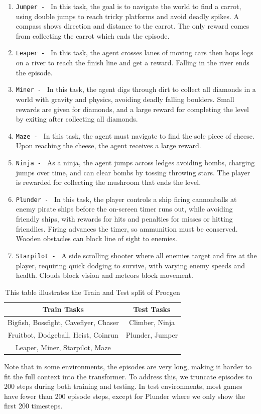 \documentclass[]{fairmeta}
\begin{document}
\begin{enumerate}
    \item \texttt{Jumper - } In this task, the goal is to navigate the world to find a carrot, using double jumps to reach tricky platforms and avoid deadly spikes. A compass shows direction and distance to the carrot. The only reward comes from collecting the carrot which ends the episode.
    \item \texttt{Leaper - } In this task, the agent crosses lanes of moving cars then hops logs on a river to reach the finish line and get a reward. Falling in the river ends the episode.
    \item \texttt{Miner - } In this task, the agent digs through dirt to collect all diamonds in a world with gravity and physics, avoiding deadly falling boulders. Small rewards are given for diamonds, and a large reward for completing the level by exiting after collecting all diamonds.
    \item \texttt{Maze - } In this task, the agent must navigate to find the sole piece of cheese. Upon reaching the cheese, the agent receives a large reward.
    \item \texttt{Ninja - } As a ninja, the agent jumps across ledges avoiding bombs, charging jumps over time, and can clear bombs by tossing throwing stars. The player is rewarded for collecting the mushroom that ends the level.
    \item \texttt{Plunder - } In this task, the player controls a ship firing cannonballs at enemy pirate ships before the on-screen timer runs out, while avoiding friendly ships, with rewards for hits and penalties for misses or hitting friendlies. Firing advances the timer, so ammunition must be conserved. Wooden obstacles can block line of sight to enemies.
    \item \texttt{Starpilot - } A side scrolling shooter where all enemies target and fire at the player, requiring quick dodging to survive, with varying enemy speeds and health. Clouds block vision and meteors block movement.
\end{enumerate}
\begin{table}[h!]
\centering
\begin{tabular}{c c }
\hline
\textbf{Train Tasks} & \textbf{Test Tasks} \\
\hline
Bigfish, Bossfight, Caveflyer, Chaser & Climber, Ninja \\
Fruitbot, Dodgeball, Heist, Coinrun & Plunder, Jumper \\
Leaper, Miner, Starpilot, Maze \\
\hline
\end{tabular}
\caption{ This table illustrates the Train and Test split of Procgen }
\label{tab:env_details_procgen}
\end{table}
Note that in some environments, the episodes are very long, making it harder to fit the full context into the transformer. To address this, we truncate episodes to 200 steps during both training and testing. In test environments, most games have fewer than 200 episode steps, except for Plunder where we only show the first 200 timesteps.
\end{document}
